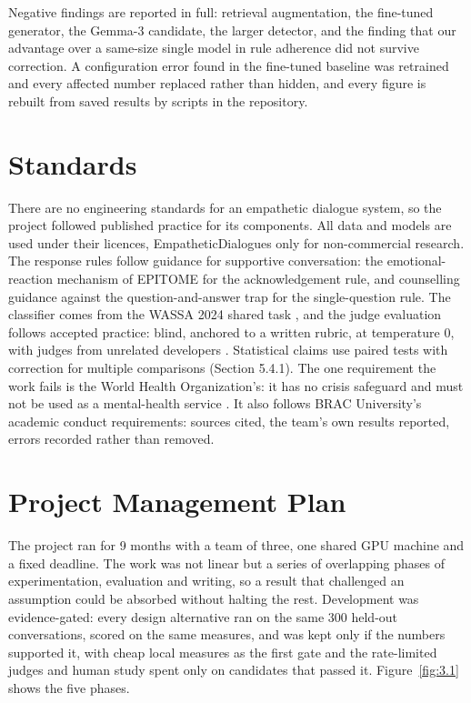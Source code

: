 Negative findings are reported in full: retrieval augmentation, the fine-tuned generator, the Gemma-3 candidate, the larger detector, and the finding that our advantage over a same-size single model in rule adherence did not survive correction. A configuration error found in the fine-tuned baseline was retrained and every affected number replaced rather than hidden, and every figure is rebuilt from saved results by scripts in the repository.

\section{Standards}
\label{sec:3.5}

There are no engineering standards for an empathetic dialogue system, so the project followed published practice for its components. All data and models are used under their licences, EmpatheticDialogues only for non-commercial research. The response rules follow guidance for supportive conversation: the emotional-reaction mechanism of EPITOME \cite{sharma2020epitome} for the acknowledgement rule, and counselling guidance against the question-and-answer trap \cite{samhsa2019tip35} for the single-question rule. The classifier comes from the WASSA 2024 shared task \cite{giorgi2024wassa}, and the judge evaluation follows accepted practice: blind, anchored to a written rubric, at temperature 0, with judges from unrelated developers \cite{verga2024}. Statistical claims use paired tests with correction for multiple comparisons (Section 5.4.1). The one requirement the work fails is the World Health Organization's: it has no crisis safeguard and must not be used as a mental-health service \cite{who2023suicide}. It also follows BRAC University's academic conduct requirements: sources cited, the team's own results reported, errors recorded rather than removed.

\section{Project Management Plan}
\label{sec:3.6}

The project ran for 9 months with a team of three, one shared GPU machine and a fixed deadline. The work was not linear but a series of overlapping phases of experimentation, evaluation and writing, so a result that challenged an assumption could be absorbed without halting the rest. Development was evidence-gated: every design alternative ran on the same 300 held-out conversations, scored on the same measures, and was kept only if the numbers supported it, with cheap local measures as the first gate and the rate-limited judges and human study spent only on candidates that passed it. Figure~\ref{fig:3.1} shows the five phases.

